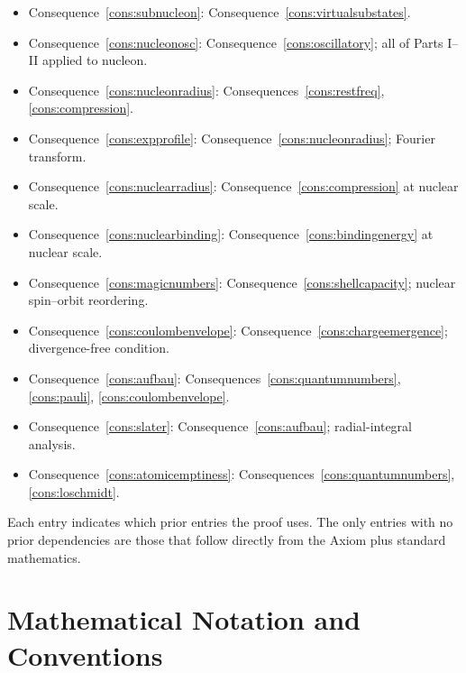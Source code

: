 \documentclass[11pt,twocolumn,a4paper]{article}
\theoremstyle{axiomstyle}
\theoremstyle{conseqstyle}
\theoremstyle{definition}
\theoremstyle{remark}
\begin{document}
\begin{itemize}
\item Consequence~\ref{cons:subnucleon}: Consequence~\ref{cons:virtualsubstates}.
\item Consequence~\ref{cons:nucleonosc}: Consequence~\ref{cons:oscillatory}; all of Parts I--II applied to nucleon.
\item Consequence~\ref{cons:nucleonradius}: Consequences~\ref{cons:restfreq}, \ref{cons:compression}.
\item Consequence~\ref{cons:expprofile}: Consequence~\ref{cons:nucleonradius}; Fourier transform.
\item Consequence~\ref{cons:nuclearradius}: Consequence~\ref{cons:compression} at nuclear scale.
\item Consequence~\ref{cons:nuclearbinding}: Consequence~\ref{cons:bindingenergy} at nuclear scale.
\item Consequence~\ref{cons:magicnumbers}: Consequence~\ref{cons:shellcapacity}; nuclear spin--orbit reordering.
\item Consequence~\ref{cons:coulombenvelope}: Consequence~\ref{cons:chargeemergence}; divergence-free condition.
\item Consequence~\ref{cons:aufbau}: Consequences~\ref{cons:quantumnumbers}, \ref{cons:pauli}, \ref{cons:coulombenvelope}.
\item Consequence~\ref{cons:slater}: Consequence~\ref{cons:aufbau}; radial-integral analysis.
\item Consequence~\ref{cons:atomicemptiness}: Consequences~\ref{cons:quantumnumbers}, \ref{cons:loschmidt}.
\end{itemize}

Each entry indicates which prior entries the proof uses. The only entries with no prior dependencies are those that follow directly from the Axiom plus standard mathematics.

\section{Mathematical Notation and Conventions}
\label{app:notation}
\end{document}
